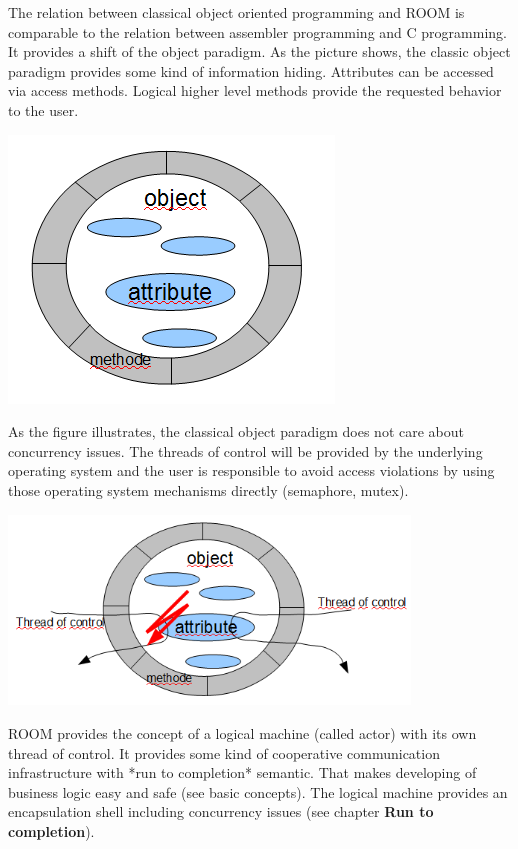 The relation between classical object oriented programming and ROOM is comparable to the relation between assembler programming and C programming. It provides a shift of the object paradigm. As the picture shows, the classic object paradigm provides some kind of information hiding. Attributes can be accessed via access methods. Logical higher level methods provide the requested behavior to the user.   

\includegraphics{images/010-RoomIntroduction01.png}

As the figure illustrates, the classical object paradigm does not care about concurrency issues. The threads of control will be provided by the underlying operating system and the user is responsible to avoid access violations by using those operating system mechanisms directly (semaphore, mutex).

\includegraphics[width=0.8\textwidth]{images/010-RoomIntroduction02.png}

ROOM provides the concept of a logical machine (called actor) with its own thread of control. It provides some kind of cooperative communication infrastructure with *run to completion* semantic. That makes developing of business logic easy and safe (see basic concepts). The logical machine provides an encapsulation shell including concurrency issues (see chapter \textbf{Run to completion}). 


